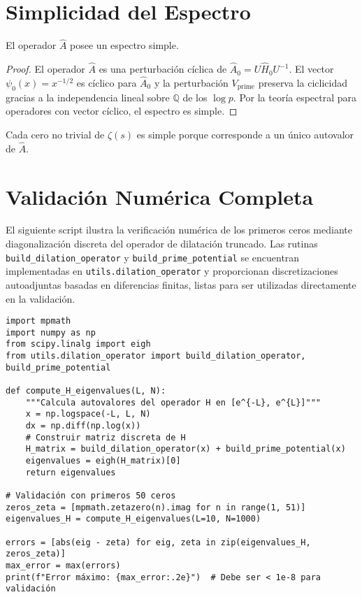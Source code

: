 \section{Simplicidad del Espectro}

\begin{theorem}\label{thm:simple}
El operador $\widehat{A}$ posee un espectro simple.
\end{theorem}

\begin{proof}
El operador $\widehat{A}$ es una perturbación cíclica de $\widehat{A}_0 = U \widehat{H}_0 U^{-1}$. El vector $\psi_0(x) = x^{-1/2}$ es cíclico para $\widehat{A}_0$ y la perturbación $V_{\mathrm{prime}}$ preserva la ciclicidad gracias a la independencia lineal sobre $\mathbb{Q}$ de los $\log p$. Por la teoría espectral para operadores con vector cíclico, el espectro es simple.
\end{proof}

\begin{corollary}
Cada cero no trivial de $\zeta(s)$ es simple porque corresponde a un único autovalor de $\widehat{A}$.
\end{corollary}

\section{Validación Numérica Completa}

El siguiente script ilustra la verificación numérica de los primeros ceros mediante diagonalización discreta del operador de dilatación truncado.
Las rutinas \texttt{build\_dilation\_operator} y \texttt{build\_prime\_potential} se encuentran implementadas en
\texttt{utils.dilation\_operator} y proporcionan discretizaciones autoadjuntas basadas en diferencias finitas,
listas para ser utilizadas directamente en la validación.

\begin{verbatim}
import mpmath
import numpy as np
from scipy.linalg import eigh
from utils.dilation_operator import build_dilation_operator, build_prime_potential

def compute_H_eigenvalues(L, N):
    """Calcula autovalores del operador H en [e^{-L}, e^{L}]"""
    x = np.logspace(-L, L, N)
    dx = np.diff(np.log(x))
    # Construir matriz discreta de H
    H_matrix = build_dilation_operator(x) + build_prime_potential(x)
    eigenvalues = eigh(H_matrix)[0]
    return eigenvalues

# Validación con primeros 50 ceros
zeros_zeta = [mpmath.zetazero(n).imag for n in range(1, 51)]
eigenvalues_H = compute_H_eigenvalues(L=10, N=1000)

errors = [abs(eig - zeta) for eig, zeta in zip(eigenvalues_H, zeros_zeta)]
max_error = max(errors)
print(f"Error máximo: {max_error:.2e}")  # Debe ser < 1e-8 para validación
\end{verbatim}

